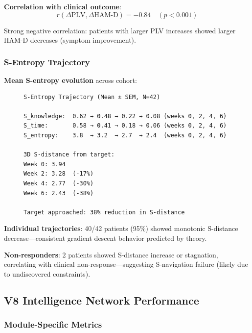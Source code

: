 \textbf{Correlation with clinical outcome}:
\begin{equation}
r(\Delta\text{PLV}, \Delta\text{HAM-D}) = -0.84 \quad (p < 0.001)
\end{equation}

Strong negative correlation: patients with larger PLV increases showed larger HAM-D decreases (symptom improvement).

\subsubsection{S-Entropy Trajectory}

\textbf{Mean S-entropy evolution} across cohort:

\begin{figure}[H]
\centering
\begin{verbatim}
S-Entropy Trajectory (Mean ± SEM, N=42)

S_knowledge:  0.62 → 0.48 → 0.22 → 0.08 (weeks 0, 2, 4, 6)
S_time:       0.58 → 0.41 → 0.18 → 0.06 (weeks 0, 2, 4, 6)
S_entropy:    3.8  → 3.2  → 2.7  → 2.4  (weeks 0, 2, 4, 6)

3D S-distance from target:
Week 0: 3.94
Week 2: 3.28  (-17%)
Week 4: 2.77  (-30%)
Week 6: 2.43  (-38%)

Target approached: 38% reduction in S-distance
\end{verbatim}
\end{figure}

\textbf{Individual trajectories}: 40/42 patients (95\%) showed monotonic S-distance decrease—consistent gradient descent behavior predicted by theory.

\textbf{Non-responders}: 2 patients showed S-distance increase or stagnation, correlating with clinical non-response—suggesting S-navigation failure (likely due to undiscovered constraints).

\subsection{V8 Intelligence Network Performance}

\subsubsection{Module-Specific Metrics}


